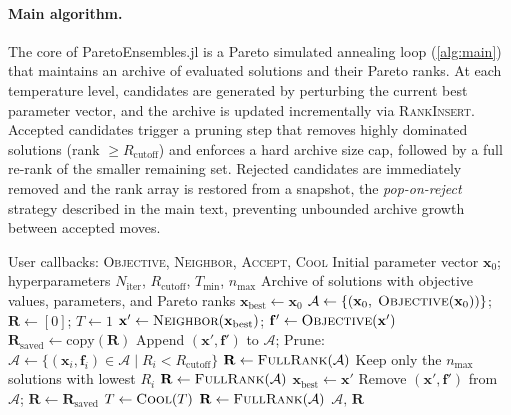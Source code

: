 \documentclass[12pt]{article}
\begin{document}
\paragraph{Main algorithm.}
The core of ParetoEnsembles.jl is a Pareto simulated annealing loop (\cref{alg:main}) that maintains an archive of evaluated solutions and their Pareto ranks.
At each temperature level, candidates are generated by perturbing the current best parameter vector, and the archive is updated incrementally via \textsc{RankInsert}.
Accepted candidates trigger a pruning step that removes highly dominated solutions (rank $\geq R_{\text{cutoff}}$) and enforces a hard archive size cap, followed by a full re-rank of the smaller remaining set.
Rejected candidates are immediately removed and the rank array is restored from a snapshot, the \emph{pop-on-reject} strategy described in the main text, preventing unbounded archive growth between accepted moves.

\begin{algorithm}[H]
\caption{\textsc{ParetoEnsembles}: Pareto simulated annealing with incremental ranking}\label{alg:main}
\begin{algorithmic}[1]
\Require User callbacks: \textsc{Objective}, \textsc{Neighbor}, \textsc{Accept}, \textsc{Cool}
\Require Initial parameter vector $\mathbf{x}_0$; hyperparameters $N_{\text{iter}}$, $R_{\text{cutoff}}$, $T_{\min}$, $n_{\max}$
\Ensure Archive of solutions with objective values, parameters, and Pareto ranks
\Statex
\State $\mathbf{x}_{\text{best}} \gets \mathbf{x}_0$
\State $\mathcal{A} \gets \{(\mathbf{x}_0,\; \textsc{Objective}(\mathbf{x}_0))\}$; \quad $\mathbf{R} \gets [0]$; \quad $T \gets 1$
\Statex
{}
    \State $\mathbf{x}' \gets \textsc{Neighbor}(\mathbf{x}_{\text{best}})$; \quad $\mathbf{f}' \gets \textsc{Objective}(\mathbf{x}')$
    \State $\mathbf{R}_{\text{saved}} \gets \text{copy}(\mathbf{R})$
    \State Append $(\mathbf{x}', \mathbf{f}')$ to $\mathcal{A}$; \quad {}
      \State Prune: $\mathcal{A} \gets \{(\mathbf{x}_i, \mathbf{f}_i) \in \mathcal{A} \mid R_i < R_{\text{cutoff}}\}$
      \State $\mathbf{R} \gets \textsc{FullRank}(\mathcal{A})$
        \State Keep only the $n_{\max}$ solutions with lowest $R_i$
        \State $\mathbf{R} \gets \textsc{FullRank}(\mathcal{A})$
      \EndIf
      \State $\mathbf{x}_{\text{best}} \gets \mathbf{x}'$
    \Else
      \State Remove $(\mathbf{x}', \mathbf{f}')$ from $\mathcal{A}$; \quad $\mathbf{R} \gets \mathbf{R}_{\text{saved}}$
    \EndIf
  \EndFor
  \State $T \gets \textsc{Cool}(T)$
\EndWhile
\State $\mathbf{R} \gets \textsc{FullRank}(\mathcal{A})$
\State \Return $\mathcal{A},\, \mathbf{R}$
\end{algorithmic}
\end{algorithm}
\end{document}
